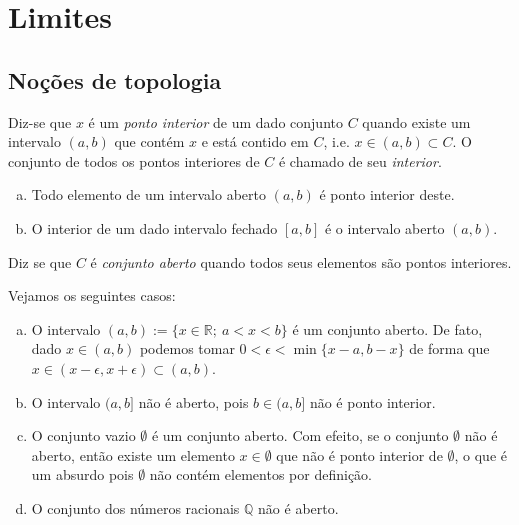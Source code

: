 
\chapter{Limites}\label{cap:limites}
\thispagestyle{fancy}

\section{Noções de topologia}

\begin{defn}
  Diz-se que $x$ é um \emph{ponto interior} de um dado conjunto $C$ quando existe um intervalo $(a, b)$ que contém $x$ e está contido em $C$, i.e. $x\in (a, b)\subset C$. O conjunto de todos os pontos interiores de $C$ é chamado de seu \emph{interior}.
\end{defn}

\begin{ex}
  \begin{enumerate}[a)]
  \item Todo elemento de um intervalo aberto $(a, b)$ é ponto interior deste.
  \item O interior de um dado intervalo fechado $[a, b]$ é o intervalo aberto $(a, b)$.
  \end{enumerate}
\end{ex}

\begin{defn}
  Diz se que $C$ é \emph{conjunto aberto} quando todos seus elementos são pontos interiores.
\end{defn}

\begin{ex}\label{ex:conjunto_aberto}
  Vejamos os seguintes casos:
  \begin{enumerate}[a)]
  \item O intervalo $(a, b) := \{x\in\mathbb{R};~a<x<b\}$ é um conjunto aberto. De fato, dado $x\in (a, b)$ podemos tomar $0 < \epsilon < \min\{x-a,b-x\}$ de forma que $x\in (x-\epsilon, x+\epsilon)\subset (a, b)$.
  \item O intervalo $(a, b]$ não é aberto, pois $b\in (a, b]$ não é ponto interior.
  \item O conjunto vazio $\emptyset$ é um conjunto aberto. Com efeito, se o conjunto $\emptyset$ não é aberto, então existe um elemento $x\in\emptyset$ que não é ponto interior de $\emptyset$, o que é um absurdo pois $\emptyset$ não contém elementos por definição.
  \item O conjunto dos números racionais $\mathbb{Q}$ não é aberto.
  \end{enumerate}
\end{ex}

